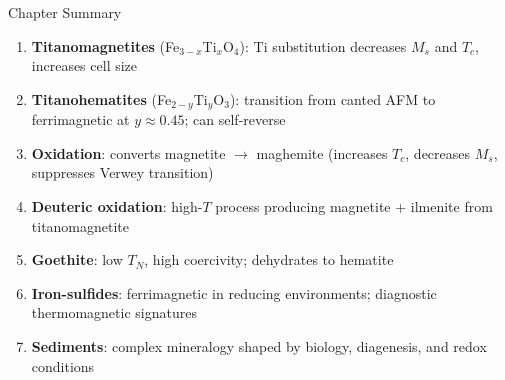 \documentclass[aspectratio=169,11pt]{beamer}
\begin{document}
\begin{frame}{Chapter Summary}

\begin{enumerate}
  \item \textbf{Titanomagnetites} (Fe$_{3-x}$Ti$_x$O$_4$): Ti substitution decreases $M_s$ and $T_c$, increases cell size
  \item \textbf{Titanohematites} (Fe$_{2-y}$Ti$_y$O$_3$): transition from canted AFM to ferrimagnetic at $y\approx0.45$; can self-reverse
  \item \textbf{Oxidation}: converts magnetite $\rightarrow$ maghemite (increases $T_c$, decreases $M_s$, suppresses Verwey transition)
  \item \textbf{Deuteric oxidation}: high-$T$ process producing magnetite + ilmenite from titanomagnetite
  \item \textbf{Goethite}: low $T_N$, high coercivity; dehydrates to hematite
  \item \textbf{Iron-sulfides}: ferrimagnetic in reducing environments; diagnostic thermomagnetic signatures
  \item \textbf{Sediments}: complex mineralogy shaped by biology, diagenesis, and redox conditions
\end{enumerate}

\end{frame}
\end{document}
